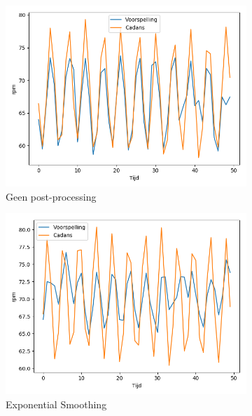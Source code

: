\begin{figure}[!t]
\centering
\begin{subfigure}{.5\textwidth}
  \centering
  \includegraphics[width=\linewidth]{images/actual-prediction+noice,nopp.png}
  \caption{Geen post-processing}
  \label{fig:geen postprocessing}
\end{subfigure}%
\begin{subfigure}{.5\textwidth}
  \centering
  \includegraphics[width=\linewidth]{images/actual-prediction+noice,es.png}
  \caption{Exponential Smoothing}
  \label{fig:exponential smoothing postprocessing}
\end{subfigure}
\begin{subfigure}{.5\textwidth}
  \centering

\end{subfigure}
\end{figure}
